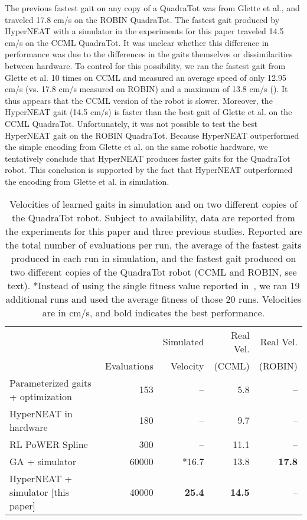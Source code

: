 The previous fastest gait on any copy of a QuadraTot was from Glette
et al., and traveled 17.8 cm/s on the ROBIN QuadraTot. The
fastest gait produced by HyperNEAT with a simulator in the experiments for this paper traveled 14.5
cm/s on the CCML QuadraTot. It was unclear whether this difference in performance was due to
the differences in the gaits themselves or dissimilarities between
hardware. To control for this possibility, we ran the fastest gait
from Glette et al. 10 times on CCML and measured an average speed of
only 12.95 cm/s (vs. 17.8 cm/s measured on ROBIN) and a maximum of
13.8 cm/s (). It thus appears that the CCML version of the robot is slower. Moreover, the HyperNEAT gait (14.5 cm/s) is faster than the best gait of Glette et al. on the CCML QuadraTot. Unfortunately, it was not possible to test the best HyperNEAT gait on the ROBIN QuadraTot. Because HyperNEAT outperformed the simple encoding from Glette et al. on the same robotic hardware, we tentatively
conclude that HyperNEAT produces faster gaits for the QuadraTot robot. This conclusion is supported by the fact that HyperNEAT outperformed the encoding from Glette et al. in simulation. 

\begin{table}
\begin{center}
\begin{tabular}{|l|r|r|r|r|}
\hline
                                         &              & Simulated  & Real Vel. & Real Vel.  \\
                                         & Evaluations  & Velocity &    (CCML)     & (ROBIN) \\
\hline
Parameterized gaits + optimization \cite{yos:clune}   &153    & --    & 5.8 & --\\
\hline
HyperNEAT in hardware \cite{yos:clune}                 & 180         & --         &   9.7  & --   \\
\hline
RL PoWER Spline \cite{haocheng}                         & 300         & --         &   11.1 & --\\
\hline
GA + simulator \cite{glette}             & 60000       & *16.7       &   13.8   & \textbf{17.8}  \\
\hline
HyperNEAT + simulator [this paper]                     & 40000       & \textbf{25.4}       &   \textbf{14.5} & --\\
\hline
\end{tabular}
\caption{Velocities of learned gaits in simulation and on two different copies of the QuadraTot robot. Subject to availability, data are reported from the experiments for this paper and three previous studies. Reported are the total number of evaluations per run, the average of the fastest gaits produced in each run in simulation, and the fastest gait produced on two different copies of the QuadraTot robot (CCML and ROBIN, see text). *Instead of using the single fitness value reported in~\cite{glette}, we ran 19 additional runs and used the average fitness of those 20 runs. Velocities are in cm/s, and bold indicates the best performance.}  
\end{center}
\end{table}

